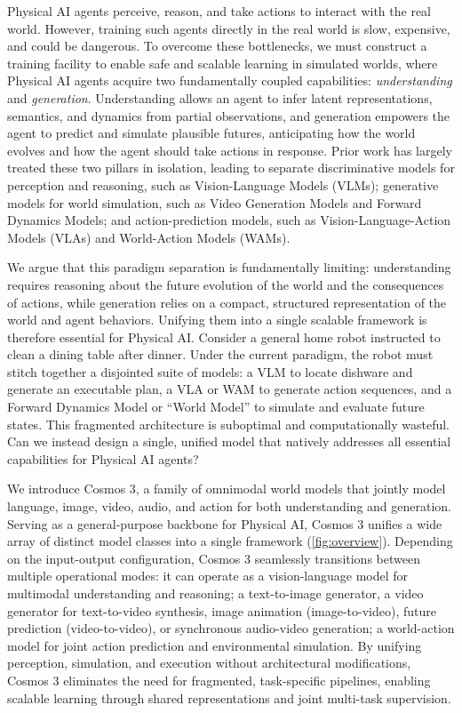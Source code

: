 \documentclass{llmxive}
\begin{document}
Physical AI agents perceive, reason, and take actions to interact with the real world. However, training such agents directly in the real world is slow, expensive, and could be dangerous. To overcome these bottlenecks, we must construct a training facility to enable safe and scalable learning in simulated worlds, where Physical AI agents acquire two fundamentally coupled capabilities: \textit{understanding} and \textit{generation}. Understanding allows an agent to infer latent representations, semantics, and dynamics from partial observations, and generation empowers the agent to predict and simulate plausible futures, anticipating how the world evolves and how the agent should take actions in response. Prior work has largely treated these two pillars in isolation, leading to separate discriminative models for perception and reasoning, such as Vision-Language Models (VLMs); generative models for world simulation, such as Video Generation Models and Forward Dynamics Models; and action-prediction models, such as Vision-Language-Action Models (VLAs) and World-Action Models (WAMs).

We argue that this paradigm separation is fundamentally limiting: understanding requires reasoning about the future evolution of the world and the consequences of actions, while generation relies on a compact, structured representation of the world and agent behaviors. Unifying them into a single scalable framework is therefore essential for Physical AI. Consider a general home robot instructed to clean a dining table after dinner. Under the current paradigm, the robot must stitch together a disjointed suite of models: a VLM to locate dishware and generate an executable plan, a VLA or WAM to generate action sequences, and a Forward Dynamics Model or ``World Model'' to simulate and evaluate future states. This fragmented architecture is suboptimal and computationally wasteful. Can we instead design a single, unified model that natively addresses all essential capabilities for Physical AI agents?

We introduce Cosmos 3, a family of omnimodal world models that jointly model language, image, video, audio, and action for both understanding and generation.
Serving as a general-purpose backbone for Physical AI, Cosmos 3 unifies a wide array of distinct model classes into a single framework (\cref{fig:overview}).
Depending on the input-output configuration, Cosmos 3 seamlessly transitions between multiple operational modes: it can operate as a vision-language model for multimodal understanding and reasoning; a text-to-image generator, a video generator for text-to-video synthesis, image animation (image-to-video), future prediction (video-to-video), or synchronous audio-video generation; a world-action model for joint action prediction and environmental simulation.
By unifying perception, simulation, and execution without architectural modifications, Cosmos 3 eliminates the need for fragmented, task-specific pipelines, enabling scalable learning through shared representations and joint multi-task supervision.
\end{document}

